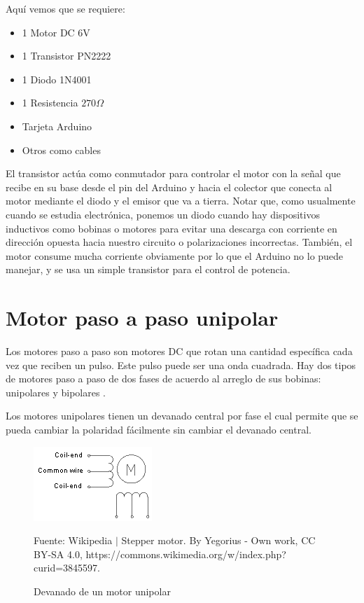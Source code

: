 \documentclass[conference]{IEEEtran}
\begin{document}
Aquí vemos que se requiere:

\begin{itemize}
\item 1 Motor DC 6V
\item 1 Transistor PN2222
\item 1 Diodo 1N4001
\item 1 Resistencia $270 \Omega$
\item Tarjeta Arduino
\item Otros como cables
\end{itemize}

\bigbreak

El transistor actúa como conmutador para controlar el motor con la señal que recibe en su base desde el pin del Arduino y hacia el colector que conecta al motor mediante el diodo y el emisor que va a tierra. Notar que, como usualmente cuando se estudia electrónica, ponemos un diodo cuando hay dispositivos inductivos como bobinas o motores para evitar una descarga con corriente en dirección opuesta hacia nuestro circuito o polarizaciones incorrectas. También, el motor consume mucha corriente obviamente por lo que el Arduino no lo puede manejar, y se usa un simple transistor para el control de potencia.

\section{Motor paso a paso unipolar}

Los motores paso a paso son motores DC que rotan una cantidad específica cada vez que reciben un pulso. Este pulso puede ser una onda cuadrada. Hay dos tipos de motores paso a paso de dos fases de acuerdo al arreglo de sus bobinas: unipolares y bipolares \cite{wikipedia-stepper-motor-2022}.

\bigbreak

Los motores unipolares tienen un devanado central por fase el cual permite que se pueda cambiar la polaridad fácilmente sin cambiar el devanado central.

\begin{figure}[H]
\centering
\includegraphics[width=0.2\paperwidth]{images/unipolar-stepper-motor-windings.png}
\caption{Devanado de un motor unipolar}
\footnotesize
Fuente: Wikipedia $\mid$ Stepper motor. By Yegorius - Own work, CC BY-SA 4.0, https://commons.wikimedia.org/w/index.php?curid=3845597.
\end{figure}
\end{document}
